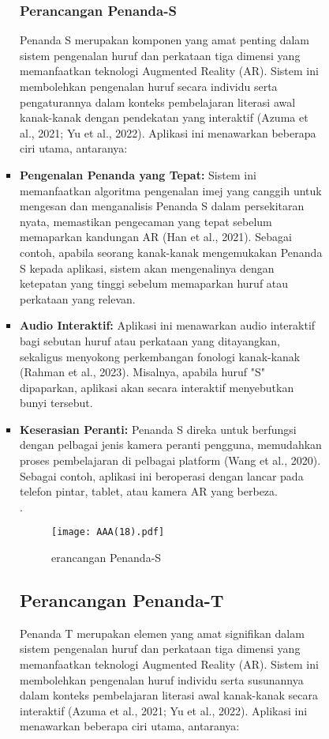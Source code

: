 \begin{itemize}
\begin{itemize}
\begin{itemize}
\begin{itemize}
\begin{itemize}
\subsubsection{Perancangan Penanda-S}
Penanda S merupakan komponen yang amat penting dalam sistem pengenalan huruf dan perkataan tiga dimensi yang memanfaatkan teknologi Augmented Reality (AR). Sistem ini membolehkan pengenalan huruf secara individu serta pengaturannya dalam konteks pembelajaran literasi awal kanak-kanak dengan pendekatan yang interaktif (Azuma et al., 2021; Yu et al., 2022). Aplikasi ini menawarkan beberapa ciri utama, antaranya: \\

\item \textbf{Pengenalan Penanda yang Tepat:} Sistem ini memanfaatkan algoritma pengenalan imej yang canggih untuk mengesan dan menganalisis Penanda S dalam persekitaran nyata, memastikan pengecaman yang tepat sebelum memaparkan kandungan AR (Han et al., 2021). Sebagai contoh, apabila seorang kanak-kanak mengemukakan Penanda S kepada aplikasi, sistem akan mengenalinya dengan ketepatan yang tinggi sebelum memaparkan huruf atau perkataan yang relevan.\\
\item \textbf{Audio Interaktif:} Aplikasi ini menawarkan audio interaktif bagi sebutan huruf atau perkataan yang ditayangkan, sekaligus menyokong perkembangan fonologi kanak-kanak (Rahman et al., 2023). Misalnya, apabila huruf "S" dipaparkan, aplikasi akan secara interaktif menyebutkan bunyi tersebut.\\
\item \textbf{Keserasian Peranti:} Penanda S direka untuk berfungsi dengan pelbagai jenis kamera peranti pengguna, memudahkan proses pembelajaran di pelbagai platform (Wang et al., 2020). Sebagai contoh, aplikasi ini beroperasi dengan lancar pada telefon pintar, tablet, atau kamera AR yang berbeza.\\
. \clearpage

\begin{figure}[h]
    \centering
    \texttt{[image: AAA(18).pdf]}
    \caption{erancangan Penanda-S}
    \label{fig:enter-label}
\end{figure}
\clearpage
\subsection{Perancangan Penanda-T}  
Penanda T merupakan elemen yang amat signifikan dalam sistem pengenalan huruf dan perkataan tiga dimensi yang memanfaatkan teknologi Augmented Reality (AR). Sistem ini membolehkan pengenalan huruf individu serta susunannya dalam konteks pembelajaran literasi awal kanak-kanak secara interaktif (Azuma et al., 2021; Yu et al., 2022). Aplikasi ini menawarkan beberapa ciri utama, antaranya:  \\
 

\end{itemize}
\end{itemize}
\end{itemize}
\end{itemize}
\end{itemize}
